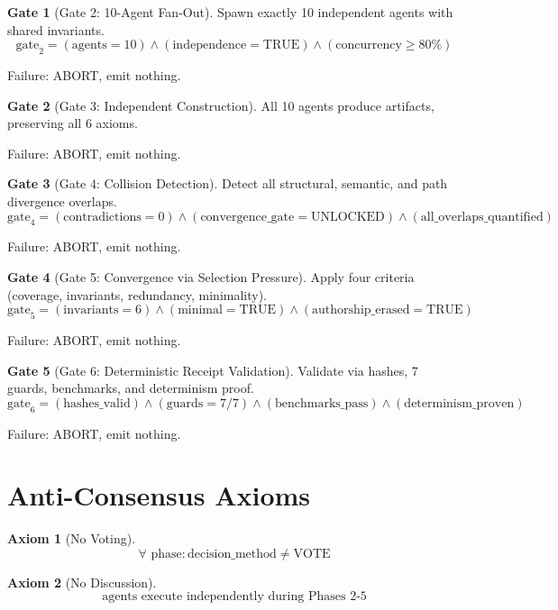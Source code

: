 \documentclass[12pt,oneside,a4paper]{book}
\theoremstyle{definition}
\newtheorem{axiom}{Axiom}[chapter]
\newtheorem{gate}{Gate}[chapter]
\begin{document}
\begin{gate}[Gate 2: 10-Agent Fan-Out]
Spawn exactly 10 independent agents with shared invariants.
$$\text{gate}_2 = (\text{agents} = 10) \land (\text{independence} = \text{TRUE}) \land (\text{concurrency} \geq 80\%)$$

Failure: ABORT, emit nothing.
\end{gate}

\begin{gate}[Gate 3: Independent Construction]
All 10 agents produce artifacts, preserving all 6 axioms.

Failure: ABORT, emit nothing.
\end{gate}

\begin{gate}[Gate 4: Collision Detection]
Detect all structural, semantic, and path divergence overlaps.
$$\text{gate}_4 = (\text{contradictions} = 0) \land (\text{convergence\_gate} = \text{UNLOCKED}) \land (\text{all\_overlaps\_quantified})$$

Failure: ABORT, emit nothing.
\end{gate}

\begin{gate}[Gate 5: Convergence via Selection Pressure]
Apply four criteria (coverage, invariants, redundancy, minimality).
$$\text{gate}_5 = (\text{invariants} = 6) \land (\text{minimal} = \text{TRUE}) \land (\text{authorship\_erased} = \text{TRUE})$$

Failure: ABORT, emit nothing.
\end{gate}

\begin{gate}[Gate 6: Deterministic Receipt Validation]
Validate via hashes, 7 guards, benchmarks, and determinism proof.
$$\text{gate}_6 = (\text{hashes\_valid}) \land (\text{guards} = 7/7) \land (\text{benchmarks\_pass}) \land (\text{determinism\_proven})$$

Failure: ABORT, emit nothing.
\end{gate}

\section{Anti-Consensus Axioms}
\label{sec:anti-consensus}

\begin{axiom}[No Voting]
$$\forall \text{ phase}: \text{decision\_method} \neq \text{VOTE}$$
\end{axiom}

\begin{axiom}[No Discussion]
$$\text{agents execute independently during Phases 2-5}$$
\end{axiom}
\end{document}
